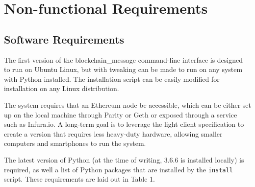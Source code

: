\documentclass[titlepage]{report}
\begin{document}
\section{Non-functional Requirements}
\subsection{Software Requirements}
The first version of the blockchain\_message command-line interface is designed to run on Ubuntu Linux, but with tweaking can be made to run on any system with Python installed. The installation script can be easily modified for installation on any Linux distribution.

The system requires that an Ethereum \gls{node} be accessible, which can be either set up on the local machine through Parity or Geth or exposed through a service such as Infura.io. A long-term goal is to leverage the light client specification to create a version that requires less heavy-duty hardware, allowing smaller computers and smartphones to run the system.

The latest version of Python (at the time of writing, 3.6.6 is installed locally) is required, as well a list of Python packages that are installed by the \texttt{install} script. These requirements are laid out in Table 1.
\end{document}
